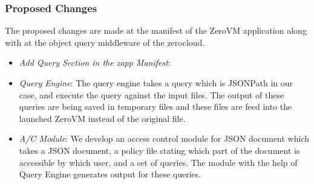 \begin{appendices}
\subsubsection{Proposed Changes}
The proposed changes are made  at the manifest of the ZeroVM application along with at the object query middleware of the zerocloud.

\begin{itemize}

\item \emph{Add Query Section in the zapp Manifest}:  

\item \emph{Query Engine}: The query engine takes a query which is JSONPath in our case, and execute the query against the input files. The output of these queries are being saved in temporary files and these files are feed into the launched ZeroVM instead  of the original file.

\item \emph{A/C Module}: We develop an  access control module for JSON document which takes a JSON document, a policy file stating which part of the document is accessible by which user, and a set of queries. The module with the help of Query Engine generates output for these queries.

\end{itemize}

\end{appendices}
